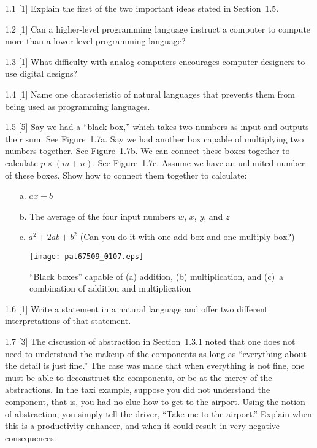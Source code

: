 \documentclass{patt}
\begin{document}
\begin{exercises}

\item[1.1]
[1] Explain the first of the two important ideas stated in Section~1.5.

\item[1.2]
[1] Can a higher-level programming language instruct a computer to
compute more than a lower-level programming language?

\item[1.3]
[1] What difficulty with analog computers encourages computer designers
to use digital designs?

\item[1.4]
[1] Name one characteristic of natural languages that prevents them
from being used as programming languages.

\item[1.5]
[5] Say we had a ``black box,'' which takes two numbers as input and
outputs their sum.  See Figure~1.7a. Say
we had another box capable of multiplying two numbers together.
See Figure~1.7b.  We can connect these boxes
together to calculate $p\times(m+n)$.  See
Figure~1.7c. Assume we have an unlimited number of these boxes.
Show how to connect them together to calculate:

\begin{enumerate}
        \item[a.] $ax+b$

        \item[b.] The average of the four input numbers
$w$, $x$, $y$, and $z$

        \item[c.] $a^2+2ab+b^2$ (Can you do it with one
add box and one multiply box?)
\end{enumerate}

\begin{figure}[b]
\centerline{\texttt{[image: pat67509\_0107.eps]}}
\caption{``Black boxes'' capable of (a) addition, (b) multiplication, and
  (c)~a combination of addition and multiplication
\label{ex_fig:black_boxes}}
\end{figure}

\item[1.6]
[1] Write a statement in a natural language and offer two different
interpre\-tations of that statement.

\item[1.7]
[3] The discussion of abstraction in Section~1.3.1 noted that one does not
need to understand the makeup of the components as long as ``everything about
the detail is just fine.''  The case was made that when everything is not fine,
one must be able to deconstruct the components, or be at the mercy of the
abstractions.  In the taxi example, suppose
you did not understand the component, that is, you had no clue how to
get to the airport.  Using the notion of abstraction, you simply tell the
driver,\break
``Take me to the airport.''  Explain when this is a productivity enhancer, and
when it could result in very negative consequences.


\end{exercises}
\end{document}
